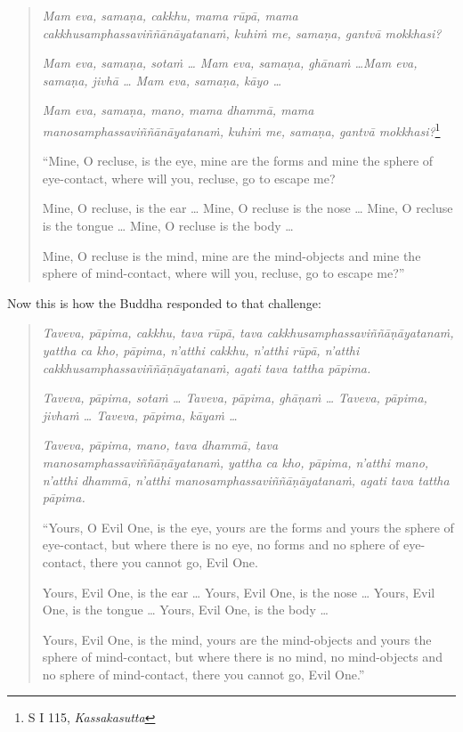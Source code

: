 \begin{quote}
\emph{Mam eva, samaṇa, cakkhu, mama rūpā, mama cakkhusamphassaviññānāyatanaṁ, kuhiṁ me, samaṇa, gantvā mokkhasi?}

\emph{Mam eva, samaṇa, sotaṁ \ldots{} Mam eva, samaṇa, ghānaṁ \ldots Mam eva, samaṇa, jivhā \ldots{} Mam eva, samaṇa, kāyo \ldots{}}

\emph{Mam eva, samaṇa, mano, mama dhammā, mama manosamphassaviññānāyatanaṁ, kuhiṁ me, samaṇa, gantvā mokkhasi?}\footnote{S I 115, \emph{Kassakasutta}}

``Mine, O recluse, is the eye, mine are the forms and mine the sphere of eye-contact, where will you, recluse, go to escape me?

Mine, O recluse, is the ear \ldots{} Mine, O recluse is the nose \ldots{} Mine, O recluse is the tongue \ldots{} Mine, O recluse is the body \ldots{}

Mine, O recluse is the mind, mine are the mind-objects and mine the sphere of mind-contact, where will you, recluse, go to escape me?''
\end{quote}

Now this is how the Buddha responded to that challenge:

\begin{quote}
\emph{Taveva, pāpima, cakkhu, tava rūpā, tava cakkhusamphassaviññāṇāyatanaṁ, yattha ca kho, pāpima, n'atthi cakkhu, n'atthi rūpā, n'atthi cakkhusamphassaviññāṇāyatanaṁ, agati tava tattha pāpima.}

\emph{Taveva, pāpima, sotaṁ \ldots{} Taveva, pāpima, ghāṇaṁ \ldots{} Taveva, pāpima, jivhaṁ \ldots{} Taveva, pāpima, kāyaṁ \ldots{}}

\emph{Taveva, pāpima, mano, tava dhammā, tava manosamphassaviññāṇāyatanaṁ, yattha ca kho, pāpima, n'atthi mano, n'atthi dhammā, n'atthi manosamphassaviññāṇāyatanaṁ, agati tava tattha pāpima.}

``Yours, O Evil One, is the eye, yours are the forms and yours the sphere of eye-contact, but where there is no eye, no forms and no sphere of eye-contact, there you cannot go, Evil One.

Yours, Evil One, is the ear \ldots{} Yours, Evil One, is the nose \ldots{} Yours, Evil One, is the tongue \ldots{} Yours, Evil One, is the body \ldots{}

Yours, Evil One, is the mind, yours are the mind-objects and yours the sphere of mind-contact, but where there is no mind, no mind-objects and no sphere of mind-contact, there you cannot go, Evil One.''
\end{quote}

